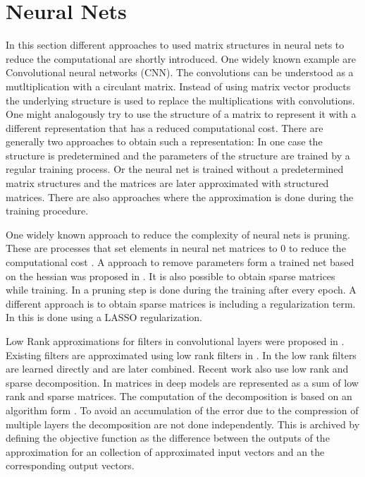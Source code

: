 \documentclass[doctype=mastersthesis,BCOR=15mm,biblatex]{ldvbook}%
\begin{document}
\section{Neural Nets}
In this section different approaches to used matrix structures in neural nets to reduce the computational are shortly introduced.
One widely known example are Convolutional neural networks (CNN).
The convolutions can be understood as a mutltiplication with a circulant matrix. 
Instead of using matrix vector products the underlying structure is used to replace the multiplications with convolutions.
One might analogously try to use the structure of a matrix to represent it with a different representation that has a reduced computational cost.
There are generally two approaches to obtain such a representation:
In one case the structure is predetermined and the parameters of the structure are trained by a regular training process.
Or the neural net is trained without a predetermined matrix structures and the matrices are later approximated with structured matrices. There are also approaches where the approximation is done during the training procedure. 

One widely known approach to reduce the complexity of neural nets is pruning. 
These are processes that set elements in neural net matrices to 0 to reduce the computational cost \cite{blalock_what_2020}.
A approach to remove parameters form a trained net based on the hessian was proposed in \cite{hassibi_optimal_1993}.
It is also possible to obtain sparse matrices while training.
In \cite{dettmers_sparse_2019} a pruning step is done during the training after every epoch.
A different approach is to obtain sparse matrices is including a regularization term.
In \cite{louizos_learning_2018,wen_learning_2016} this is done using a LASSO regularization.

Low Rank approximations for filters in convolutional layers were proposed in \cite{rigamonti_learning_2013}. Existing filters are approximated using low rank filters in \cite{jaderberg_speeding_2014}. 
In \cite{ioannou_training_2016} the low rank filters are learned directly and are later combined.
Recent work also use low rank and sparse decomposition. 
In \cite{yu_compressing_2017} matrices in deep models are represented as a sum of low rank and sparse matrices.
The computation of the decomposition is based on an algorithm form \cite{zhou_greedy_2013}.
To avoid an accumulation of the error due to the compression of multiple layers the decomposition are not done independently.
This is archived by defining the objective function as the difference between the outputs of the approximation for an collection of approximated input vectors and an the corresponding output vectors.
\end{document}
